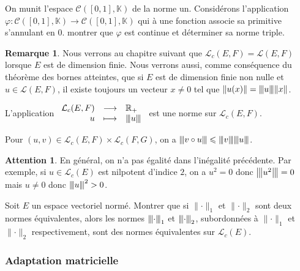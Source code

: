 \documentclass[french]{article}
\newcommand{\R}{\mathbb{R}}
\newcommand{\K}{\mathbb{K}}
\newcommand{\vertiii}[1]{{\left\vert\kern-0.25ex\left\vert\kern-0.25ex\left\vert #1 \right\vert\kern-0.25ex\right\vert\kern-0.25ex\right\vert}}
\theoremstyle{plain}
\theoremstyle{definition}
\newtheorem*{rmq}{Remarque}
\newtheorem*{attention}{Attention}
\theoremstyle{remark}
\begin{document}
\begin{exo}
	On munit l'espace $\mathcal{C}([0,1],\K)$ de la norme un. Considérons l'application $\varphi:\mathcal{C}([0,1],\K)\to\mathcal{C}([0,1],\K)$ qui à une fonction associe sa primitive s'annulant en $0$. montrer que $\varphi$ est continue et déterminer sa norme triple.
\end{exo}

\begin{rmq}
	Nous verrons au chapitre suivant que $\mathcal{L}_c(E,F)=\mathcal{L}(E,F)$ lorsque $E$ est de dimension finie. Nous verrons aussi, comme conséquence du théorème des bornes atteintes, que si $E$ est de dimension finie non nulle et $u\in\mathcal{L}(E,F)$, il existe toujours un vecteur $x\ne0$ tel que $\lVert u(x)\rVert=\vertiii{u}\lVert x\rVert$.
\end{rmq}

\begin{prop}%
	L'application $\begin{array}{rcl}
		\mathcal{L}_c(E,F)&\longrightarrow&\R_+\\
		u&\longmapsto&\vertiii{u}
	\end{array}$ est une norme sur $\mathcal{L}_c(E,F)$.
\end{prop}

\begin{prop}%
	Pour $(u,v)\in\mathcal{L}_c(E,F)\times\mathcal{L}_c(F,G)$, on a $\vertiii{v\circ u}\leqslant\vertiii{v}\vertiii{u}$.
\end{prop}

\begin{attention}
	En général, on n'a pas égalité dans l'inégalité précédente. Par exemple, si $u\in\mathcal{L}_c(E)$ est nilpotent d'indice $2$, on a $u^2=0$ donc $\vertiii{u^2}=0$ mais $u\ne 0$ donc $\vertiii{u}^2>0$.
\end{attention}

\begin{exo}
	Soit $E$ un espace vectoriel normé. Montrer que si $\lVert\cdot\rVert_1$ et $\lVert\cdot\rVert_2$ sont deux normes équivalentes, alors les normes $\vertiii{\cdot}_1$ et $\vertiii{\cdot}_2$, subordonnées à $\lVert\cdot\rVert_1$ et $\lVert\cdot\rVert_2$ respectivement, sont des normes équivalentes sur $\mathcal{L}_c(E)$.
\end{exo}

\subsubsection*{Adaptation matricielle}
\end{document}

